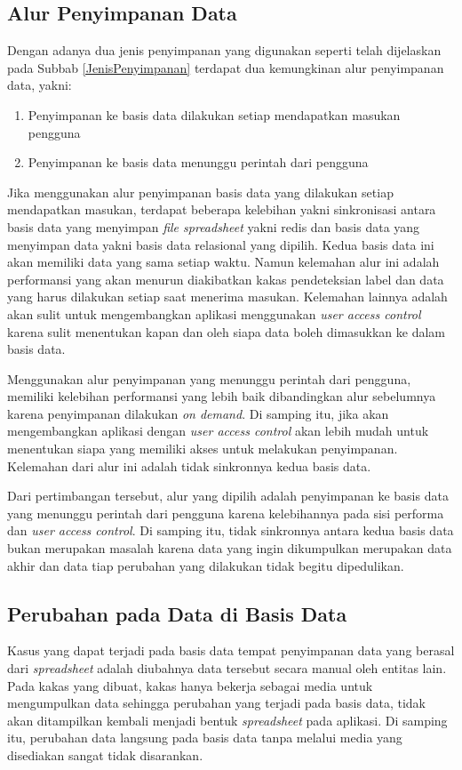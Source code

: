 	\subsection{Alur Penyimpanan Data}
	Dengan adanya dua jenis penyimpanan yang digunakan seperti telah dijelaskan pada Subbab \ref{JenisPenyimpanan} terdapat dua kemungkinan alur penyimpanan data, yakni:
	\begin{enumerate}
		\item Penyimpanan ke basis data dilakukan setiap mendapatkan masukan pengguna
		\item Penyimpanan ke basis data menunggu perintah dari pengguna
	\end{enumerate}
	Jika menggunakan alur penyimpanan basis data yang dilakukan setiap mendapatkan masukan, terdapat beberapa kelebihan yakni sinkronisasi antara basis data yang menyimpan \textit{file spreadsheet} yakni redis dan basis data yang menyimpan data yakni basis data relasional yang dipilih. Kedua basis data ini akan memiliki data yang sama setiap waktu. Namun kelemahan alur ini adalah performansi yang akan menurun diakibatkan kakas pendeteksian label dan data yang harus dilakukan setiap saat menerima masukan. Kelemahan lainnya adalah akan sulit untuk mengembangkan aplikasi menggunakan \textit{user access control} karena sulit menentukan kapan dan oleh siapa data boleh dimasukkan ke dalam basis data.

	Menggunakan alur penyimpanan yang menunggu perintah dari pengguna, memiliki kelebihan performansi yang lebih baik dibandingkan alur sebelumnya karena penyimpanan dilakukan \textit{on demand}. Di samping itu, jika akan mengembangkan aplikasi dengan \textit{user access control} akan lebih mudah untuk menentukan siapa yang memiliki akses untuk melakukan penyimpanan. Kelemahan dari alur ini adalah tidak sinkronnya kedua basis data.

	Dari pertimbangan tersebut, alur yang dipilih adalah penyimpanan ke basis data yang menunggu perintah dari pengguna karena kelebihannya pada sisi performa dan \textit{user access control}. Di samping itu, tidak sinkronnya antara kedua basis data bukan merupakan masalah karena data yang ingin dikumpulkan merupakan data akhir dan data tiap perubahan yang dilakukan tidak begitu dipedulikan.

	\subsection{Perubahan pada Data di Basis Data}
	Kasus yang dapat terjadi pada basis data tempat penyimpanan data yang berasal dari \textit{spreadsheet} adalah diubahnya data tersebut secara manual oleh entitas lain. Pada kakas yang dibuat, kakas hanya bekerja sebagai media untuk mengumpulkan data sehingga perubahan yang terjadi pada basis data, tidak akan ditampilkan kembali menjadi bentuk \textit{spreadsheet} pada aplikasi. Di samping itu, perubahan data langsung pada basis data tanpa melalui media yang disediakan sangat tidak disarankan.

